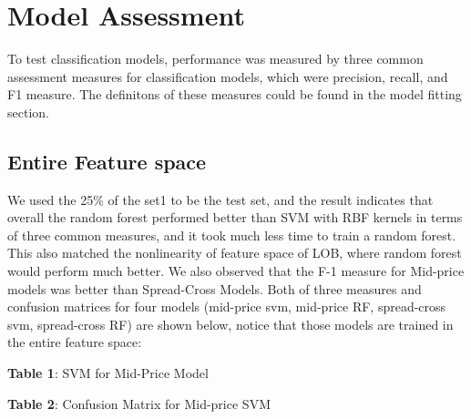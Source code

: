 \documentclass[11pt]{article}
\begin{document}
\section{Model Assessment}
To test classification models, performance was measured by three common assessment measures for classification models, which were precision, recall, and F1 measure. The definitons of these measures could be found in the model fitting section.
\subsection{Entire Feature space}
We used the 25\% of the set1 to be the test set, and the result indicates that overall the random forest performed better than SVM with RBF kernels in terms of three common measures, and it took much less time to train a random forest. This also matched the nonlinearity of feature space of LOB, where random forest would perform much better. We also observed that the F-1 measure for Mid-price models was better than Spread-Cross Models. Both of three measures and confusion matrices for four models (mid-price svm, mid-price RF, spread-cross svm, spread-cross RF) are shown below, notice that those models are trained in the entire feature space:
\begin{multicols}{2}
\begin{center}
\renewcommand{\arraystretch}{1.4}

\vspace{0.5 cm}
\small \textbf{Table 1}: SVM for Mid-Price Model
\end{center}

\begin{center}
\renewcommand{\arraystretch}{1.4}

\vspace{0.5 cm}
\small \textbf{Table 2}: Confusion Matrix for Mid-price SVM
\end{center}

\end{multicols}
\end{document}
